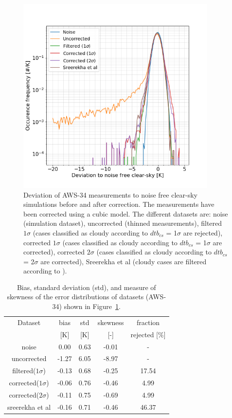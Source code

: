 \documentclass[12pt]{article}
\begin{document}
%
\begin{figure}[!tb]
  \centering \includegraphics[height=100mm]{PDF_corrected_AWS-34_AWS-42_thinned}
	\caption{Deviation of AWS-34 measurements to noise free clear-sky
      simulations before and after correction. The measurements have been
      corrected using a cubic model. The different datasets are: noise
      (simulation dataset), uncorrected (thinned measurements), filtered $1\sigma$ (cases classified as cloudy according to $dtb_{cs}$ = 1$\sigma$ are rejected), corrected $1\sigma$ (cases classified as cloudy according to $dtb_{cs}$ = 1$\sigma$ are corrected), corrected
      $2\sigma$ (cases classified as cloudy according to $dtb_{cs}$ = 2$\sigma$ are corrected), Sreerekha et al (cloudy cases are filtered according to \citet{rekha2012potential}).}
	\label{fig:correction:c34-42:thinned}
\end{figure}
%
\begin{table}[!p]
	\centering
	\begin{tabular}[b]{c|c|c|c|c}
		Dataset  		  &   bias &   std &   skewness  & fraction  \\
		&   [K]  &   [K] & [-] & rejected [\%]\\
		\hline
	noise             		&   0.00 &  0.63 &              -0.01 &                - \\
	uncorrected     		&  -1.27 &  6.05 &              -8.97 &                - \\
	filtered($1\sigma$)  	&  -0.13 &  0.68 &              -0.25 &               17.54 \\
	corrected($1\sigma$) 	&  -0.06 &  0.76 &              -0.46 &                4.99 \\
	corrected($2\sigma$) 	&  -0.11 &  0.75 &              -0.69 &                4.99 \\
	sreerekha et al         &  -0.16 &  0.71 &              -0.46 &               46.37 \\			
		\hline
\end{tabular}
\caption{Bias, standard deviation (std), and measure of skewness of the error
  distributions of datasets (AWS-34) shown in
  Figure~\ref{fig:correction:c34-42:thinned}.}
\label{tab:correction:stats:34:42:thinned}
\end{table}
\end{document}
